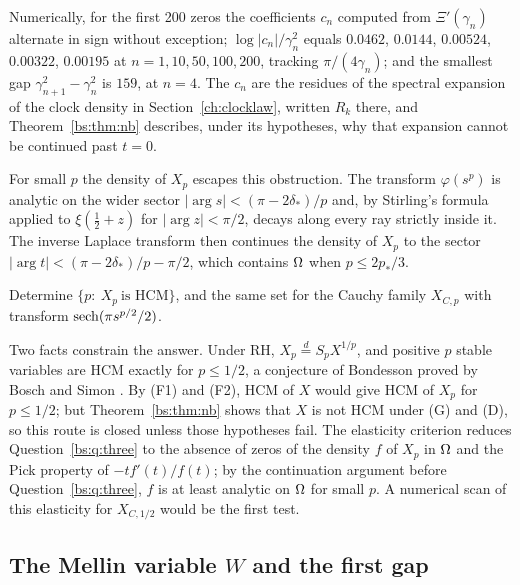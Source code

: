 Numerically, for the first 200 zeros the coefficients $c_n$ computed from $\Xi'(\gamma_n)$ alternate in sign without exception; $\log|c_n|/\gamma_n^2$ equals $0.0462$, $0.0144$, $0.00524$, $0.00322$, $0.00195$ at $n=1,10,50,100,200$, tracking $\pi/(4\gamma_n)$; and the smallest gap $\gamma_{n+1}^2-\gamma_n^2$ is $159$, at $n=4$. The $c_n$ are the residues of the spectral expansion of the clock density in Section~\ref{ch:clocklaw}, written $R_k$ there, and Theorem~\ref{bs:thm:nb} describes, under its hypotheses, why that expansion cannot be continued past $t=0$.

For small $p$ the density of $X_p$ escapes this obstruction. The transform $\varphi(s^p)$ is analytic on the wider sector $|\arg s|<(\pi-2\delta_*)/p$ and, by Stirling's formula applied to $\xi(\frac12+z)$ for $|\arg z|<\pi/2$, decays along every ray strictly inside it. The inverse Laplace transform then continues the density of $X_p$ to the sector $|\arg t|<(\pi-2\delta_*)/p-\pi/2$, which contains $\Omega$ when $p\le2p_*/3$.

\begin{question}\label{bs:q:three}
Determine $\{p:\ X_p\ \text{is HCM}\}$, and the same set for the Cauchy family $X_{C,p}$ with transform $\operatorname{sech}(\pi s^{p/2}/2)$.
\end{question}

Two facts constrain the answer. Under RH, $X_p\stackrel{d}{=}S_pX^{1/p}$, and positive $p$ stable variables are HCM exactly for $p\le1/2$, a conjecture of Bondesson \cite[Sections 5.7, 5.8 and 7.2]{Bondesson} proved by Bosch and Simon \cite[p.~32]{BoschSimon16}. By (F1) and (F2), HCM of $X$ would give HCM of $X_p$ for $p\le1/2$; but Theorem~\ref{bs:thm:nb} shows that $X$ is not HCM under (G) and (D), so this route is closed unless those hypotheses fail. The elasticity criterion reduces Question~\ref{bs:q:three} to the absence of zeros of the density $f$ of $X_p$ in $\Omega$ and the Pick property of $-tf'(t)/f(t)$; by the continuation argument before Question~\ref{bs:q:three}, $f$ is at least analytic on $\Omega$ for small $p$. A numerical scan of this elasticity for $X_{C,1/2}$ would be the first test.

\subsection{The Mellin variable $W$ and the first gap}

